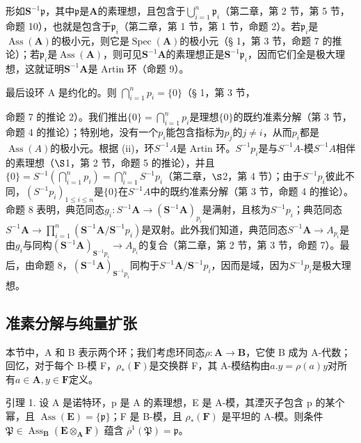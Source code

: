 形如\(\mathbf{S}^{-1}\mathfrak{p}\)，其中\(\mathfrak{p}\)是\(\mathbf{A}\)的素理想，且包含于\(\bigcup_{i=1}^{n} \mathfrak{p}_i\)（第二章，第 2 节，第 5 节，命题 10），也就是包含于\(\mathfrak{p}_i\)（第二章，第 1 节，第 1 节，命题 2）。若\(\mathfrak{p}_i\)是\(\operatorname{Ass}(\mathbf{A})\)的极小元，则它是\(\operatorname{Spec}(\mathbf{A})\)的极小元（§ 1，第 3 节，命题 7 的推论）；若\(\mathfrak{p}_i\)是\(\operatorname{Ass}(\mathbf{A})\)，则可见\(\mathbf{S}^{-1}\mathbf{A}\)的素理想正是\(\mathbf{S}^{-1}\mathfrak{p}_i\)，因而它们全是极大理想，这就证明\(\mathbf{S}^{-1}\mathbf{A}\)是 Artin 环（命题 9）。

最后设环 A 是约化的。则 \(\bigcap_{i=1}^{n} p_i = \{0\}\)（§ 1，第 3 节，

命题 7 的推论 2）。我们推出\(\{0\} = \bigcap_{i=1}^{n} p_i\)是理想\(\{0\}\)的既约准素分解（第 3 节，命题 4 的推论）；特别地，没有一个\(p_i\)能包含指标为\(p_j\)的\(j \neq i\)，从而\(p_i\)都是\(\operatorname{Ass}(A)\)的极小元。根据 (ii)，环\(S^{-1}A\)是 Artin 环。\(S^{-1}p_i\)是与\(S^{-1}A\)-模\(S^{-1}A\)相伴的素理想（\(\S\)1，第 2 节，命题 5 的推论），并且\(\{0\} = S^{-1}\left(\bigcap_{i=1}^{n} p_i\right) = \bigcap_{i=1}^{n} S^{-1}p_i\)（第二章，\(\S\)2，第 4 节）；由于\(S^{-1}p_i\)彼此不同，\((S^{-1}p_i)_{1 \leqslant i \leqslant n}\)是\(\{0\}\)在\(S^{-1}A\)中的既约准素分解（第 3 节，命题 4 的推论）。命题 8 表明，典范同态\(g_{i} \colon S^{-1}\mathbf{A} \to (\mathbf{S}^{-1}\mathbf{A})_{p_{i}}\)是满射，且核为\(S^{-1}p_{i}\)；典范同态\(S^{-1}\mathbf{A} \to \prod_{i=1}^{n} (\mathbf{S}^{-1}\mathbf{A}/\mathbf{S}^{-1}p_{i})\)是双射。此外我们知道，典范同态\(S^{-1}\mathbf{A} \to A_{p_{i}}\)是由\(g_{i}\)与同构\((\mathbf{S}^{-1}\mathbf{A})_{\mathbf{S}^{-1}p_{i}} \to A_{p_{i}}\)的复合（第二章，第 2 节，第 3 节，命题 7）。最后，由命题 8，\((\mathbf{S}^{-1}\mathbf{A})_{\mathbf{S}^{-1}p_{i}}\)同构于\(S^{-1}\mathbf{A}/\mathbf{S}^{-1}p_{i}\)，因而是域，因为\(S^{-1}p_{i}\)是极大理想。

\subsection{准素分解与纯量扩张}

本节中，A 和 B 表示两个环；我们考虑环同态\(\rho: \mathbf{A} \to \mathbf{B}\)，它使 B 成为 A-代数；回忆，对于每个 B-模 F，\(\rho_*(\mathbf{F})\)是交换群 F，其 A-模结构由\(a.y = \rho(a)y\)对所有\(a \in \mathbf{A}, y \in \mathbf{F}\)定义。

引理 1. 设 A 是诺特环，p 是 A 的素理想，E 是 A-模，其湮灭子包含 p 的某个幂，且 \(\operatorname{Ass}(\mathbf{E}) = \{\mathfrak{p}\}\)；F 是 B-模，且 \(\rho_{*}(\mathbf{F})\) 是平坦的 A-模。则条件 \(\mathfrak{P} \in \operatorname{Ass}_{\mathbf{B}}(\mathbf{E} \otimes_{\mathbf{A}} \mathbf{F})\) 蕴含 \(\overline{\rho}^{1}(\mathfrak{P}) = \mathfrak{p}\)。

